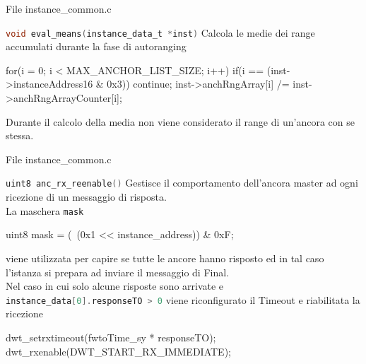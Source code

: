 \begin{frame}[fragile]{File instance\_common.c}
  \begin{block}{\lstinline[language=C]!void eval_means(instance_data_t *inst)! \newfunction}
    Calcola le medie dei range accumulati durante la fase di autoranging
    \begin{C}
      for(i = 0; i < MAX_ANCHOR_LIST_SIZE; i++)
      {
        if(i == (inst->instanceAddress16 & 0x3))
          continue;
        inst->anchRngArray[i] /= inst->anchRngArrayCounter[i];
      }
    \end{C}
    Durante il calcolo della media \alert{non} viene considerato il range di un'ancora con se stessa.
  \end{block}
\end{frame}


\begin{frame}[fragile, shirnk=30]{File instance\_common.c}
  \begin{block}{\lstinline[language=C]!uint8 anc_rx_reenable()! \newfunction}
    Gestisce il comportamento dell'ancora \alert{master} ad ogni ricezione di un messaggio di risposta.\\
    La maschera \lstinline[language=C]!mask!
    \begin{C}
    uint8 mask = (~(0x1 << instance_address)) & 0xF;
    \end{C}
    viene utilizzata per capire se tutte le ancore hanno risposto ed in tal caso l'istanza si prepara ad inviare il messaggio di Final.\\
    Nel caso in cui solo alcune risposte sono arrivate e \lstinline[language=C]!instance_data[0].responseTO > 0! viene riconfigurato il Timeout e riabilitata
    la ricezione 
    \begin{C}
    dwt_setrxtimeout(fwtoTime_sy * responseTO); 
    dwt_rxenable(DWT_START_RX_IMMEDIATE);
    \end{C}
  \end{block}
\end{frame}

